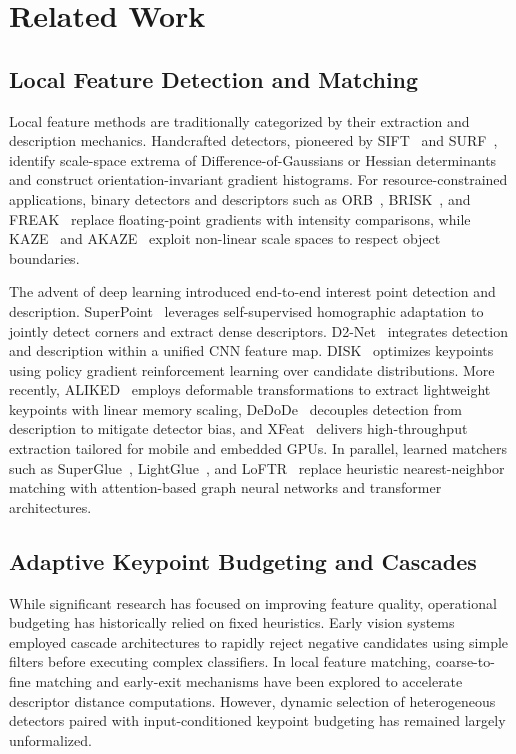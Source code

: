 \documentclass[conference]{IEEEtran}
\begin{document}
\section{Related Work}
\label{sec:related}

\subsection{Local Feature Detection and Matching}
Local feature methods are traditionally categorized by their extraction and description mechanics. Handcrafted detectors, pioneered by SIFT~\cite{lowe2004sift} and SURF~\cite{bay2006surf}, identify scale-space extrema of Difference-of-Gaussians or Hessian determinants and construct orientation-invariant gradient histograms. For resource-constrained applications, binary detectors and descriptors such as ORB~\cite{rublee2011orb}, BRISK~\cite{leutenegger2011brisk}, and FREAK~\cite{alahi2012freak} replace floating-point gradients with intensity comparisons, while KAZE~\cite{alcantarilla2012kaze} and AKAZE~\cite{alcantarilla2013akaze} exploit non-linear scale spaces to respect object boundaries.

The advent of deep learning introduced end-to-end interest point detection and description. SuperPoint~\cite{detone2018superpoint} leverages self-supervised homographic adaptation to jointly detect corners and extract dense descriptors. D2-Net~\cite{dusmanu2019d2net} integrates detection and description within a unified CNN feature map. DISK~\cite{tyszkiewicz2020disk} optimizes keypoints using policy gradient reinforcement learning over candidate distributions. More recently, ALIKED~\cite{zhao2023aliked} employs deformable transformations to extract lightweight keypoints with linear memory scaling, DeDoDe~\cite{edstedt2024dedode} decouples detection from description to mitigate detector bias, and XFeat~\cite{potje2024xfeat} delivers high-throughput extraction tailored for mobile and embedded GPUs. In parallel, learned matchers such as SuperGlue~\cite{sarlin2020superglue}, LightGlue~\cite{lindenberger2023lightglue}, and LoFTR~\cite{sun2021loftr} replace heuristic nearest-neighbor matching with attention-based graph neural networks and transformer architectures.

\subsection{Adaptive Keypoint Budgeting and Cascades}
While significant research has focused on improving feature quality, operational budgeting has historically relied on fixed heuristics. Early vision systems employed cascade architectures to rapidly reject negative candidates using simple filters before executing complex classifiers. In local feature matching, coarse-to-fine matching and early-exit mechanisms have been explored to accelerate descriptor distance computations. However, dynamic selection of heterogeneous detectors paired with input-conditioned keypoint budgeting has remained largely unformalized.
\end{document}
